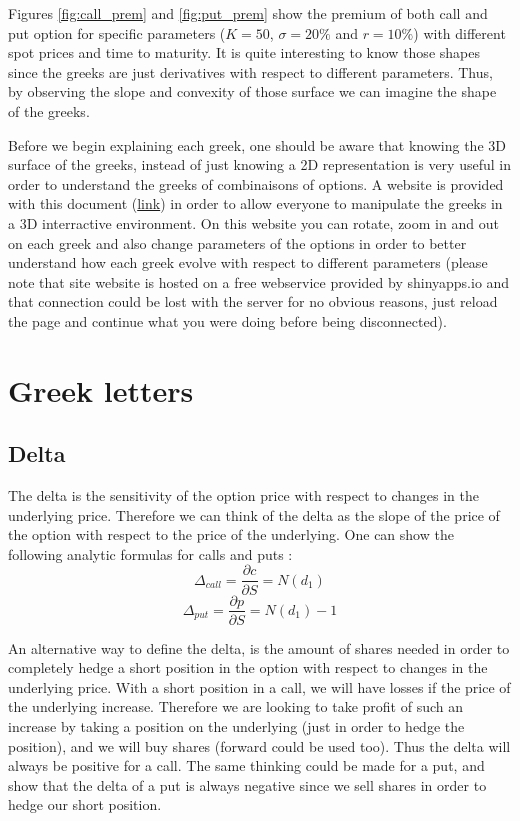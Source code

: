 \documentclass[hidelinks]{article}
\begin{document}
    
    Figures \ref{fig:call_prem} and \ref{fig:put_prem} show the premium of both call and put option for specific parameters ($K=50$, $\sigma=20\%$ and $r=10\%$) with different spot prices and time to maturity. It is quite interesting to know those shapes since the greeks are just derivatives with respect to different parameters. Thus, by observing the slope and convexity of those surface we can imagine the shape of the greeks. 
    
    Before we begin explaining each greek, one should be aware that knowing the 3D surface of the greeks, instead of just knowing a 2D representation is very useful in order to understand the greeks of combinaisons of options. A website is provided with this document (\href{https://maxencecoupet.shinyapps.io/options_greeks/}{link}) in order to allow everyone to manipulate the greeks in a 3D interractive environment. On this website you can rotate, zoom in and out on each greek and also change parameters of the options in order to better understand how each greek evolve with respect to different parameters (please note that site website is hosted on a free webservice provided by shinyapps.io and that connection could be lost with the server for no obvious reasons, just reload the page and continue what you were doing before being disconnected).
	
	\newpage
	\section{Greek letters}
	
	\subsection{Delta}
	
	The delta is the sensitivity of the option price with respect to changes in the underlying price. Therefore we can think of the delta as the slope of the price of the option with respect to the price of the underlying. One can show the following analytic formulas for calls and puts :
	$$ \Delta_{call}= \frac{\partial c}{\partial S} = N(d_1)$$
	$$ \Delta_{put}= \frac{\partial p}{\partial S} = N(d_1)-1$$
	
	An alternative way to define the delta, is the amount of shares needed in order to completely hedge a short position in the option with respect to changes in the underlying price. With a short position in a call, we will have losses if the price of the underlying increase. Therefore we are looking to take profit of such an increase by taking a position on the underlying (just in order to hedge the position), and we will buy shares (forward could be used too). Thus the delta will always be positive for a call. The same thinking could be made for a put, and show that the delta of a put is always negative since we sell shares in order to hedge our short position. 
	
\end{document}
